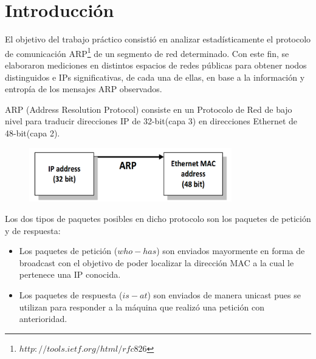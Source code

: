 \documentclass[10pt, a4paper]{article}
\author{Teor\'ia de las Comunicaciones, DC, UBA.}
\date{}
\title{}
\begin{document}
	
\thispagestyle{empty}

\maketitle

\tableofcontents
\newpage

\section{Introducción}
El objetivo del trabajo práctico consistió en analizar estadísticamente el protocolo de comunicación ARP\footnote{$http://tools.ietf.org/html/rfc826$} de un segmento de red determinado. Con este fin, se elaboraron mediciones en distintos espacios de redes públicas para obtener nodos distinguidos e IPs significativas, de cada una de ellas, en base a la información y entropía de los mensajes ARP observados.

ARP (Address Resolution Protocol) consiste en un Protocolo de Red de bajo nivel para traducir direcciones IP de 32-bit(capa 3) en direcciones Ethernet de 48-bit(capa 2).

\begin{figure}[H] %
\begin{center}
\includegraphics[width=250pt]{../imgs/IPtoMAC.png}
\end{center}
\end{figure}

Los dos tipos de paquetes posibles en dicho protocolo son los paquetes de petición y de respuesta:
\begin{itemize}
\item Los paquetes de petición ($who-has$) son enviados mayormente en forma de broadcast con el objetivo de poder localizar la dirección MAC a la cual le pertenece una IP conocida.
\item Los paquetes de respuesta ($is-at$) son enviados de manera unicast pues se utilizan para responder a la máquina que realizó una petición con anterioridad.
\end{itemize}
\end{document}
